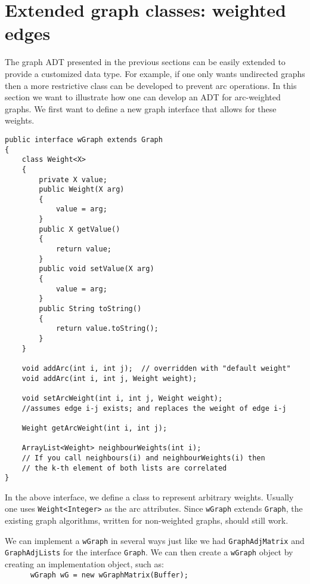 \section{Extended graph classes: weighted edges}
\label{sec:wgraphs}

The graph ADT presented in the previous sections can be easily extended
to provide a  customized data type.  For example, if one only wants
undirected graphs then a more restrictive class can be developed to
prevent arc operations.  In this section we want to illustrate how one
can develop an ADT for arc-weighted graphs. We first want to define a
new graph interface that allows for these weights.

{\renewcommand{\ttdefault}{pcr} %
\footnotesize \begin{verbatim}
public interface wGraph extends Graph
{
    class Weight<X>
    {
        private X value;
        public Weight(X arg)
        {
            value = arg;
        }
        public X getValue()
        {
            return value;
        }
        public void setValue(X arg)
        {
            value = arg;
        }
        public String toString()
        {
            return value.toString();
        }
    }

    void addArc(int i, int j);  // overridden with "default weight"
    void addArc(int i, int j, Weight weight);   

    void setArcWeight(int i, int j, Weight weight);    
    //assumes edge i-j exists; and replaces the weight of edge i-j

    Weight getArcWeight(int i, int j);

    ArrayList<Weight> neighbourWeights(int i);   
    // If you call neighbours(i) and neighbourWeights(i) then 
    // the k-th element of both lists are correlated
}
\end{verbatim}%
}

In the above interface, we define a class to represent arbitrary
weights. Usually one uses \verb|Weight<Integer>| as the arc attributes.
Since \verb|wGraph| extends \verb|Graph|, the existing graph algorithms,
written for non-weighted graphs, should still work.

We can implement a \verb|wGraph| in several ways just like we had
\verb|GraphAdjMatrix| and \verb|GraphAdjLists| for the interface
\verb|Graph|.  We can then create a \verb|wGraph| object by creating an
implementation object, such as:\\
\verb|      wGraph wG = new wGraphMatrix(Buffer);|

